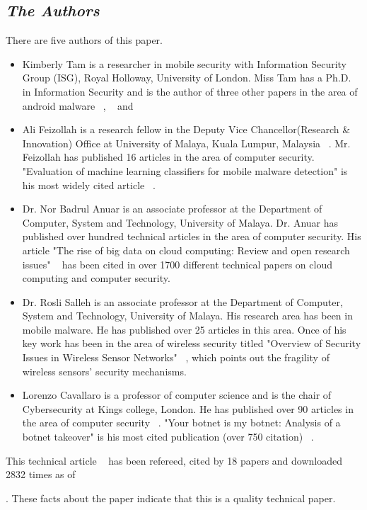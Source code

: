 \documentclass[letterpaper,10pt]{texMemo}
\begin{document}
\subsection*{\textit{The Authors}}
 There are five authors of this paper.
\begin {itemize}
    \item Kimberly Tam is a researcher in mobile security with Information Security Group (ISG), Royal Holloway, University of London. Miss Tam has a Ph.D. in Information Security and is the author of three other papers in the area of android malware ~\cite{aa0df639998f45b7ba185cb98b5566f6}, ~\cite{81e7d86ec07b4b2ebad265799695b710} and ~\cite{abda74ffb56a4eeabc5787b7903706cf}
    \item Ali Feizollah is a research fellow in the Deputy Vice Chancellor(Research \& Innovation) Office at University of Malaya, Kuala Lumpur, Malaysia ~\cite{UMEXPERT75:online}. Mr. Feizollah has published 16 articles in the area of computer security. "Evaluation of machine learning classifiers for mobile malware detection" is his most widely cited article ~\cite{Narudin2016}.
    \item Dr. Nor Badrul Anuar is an associate professor at the Department of Computer, System and Technology, University of Malaya. Dr. Anuar has published over hundred technical articles in the area of computer security. His article "The rise of big data on cloud computing: Review and open research issues" ~\cite{Theriseo64:online} has been cited in over 1700 different technical papers on cloud computing and computer security.
    \item Dr. Rosli Salleh is an associate professor at the Department of Computer, System and Technology, University of Malaya. His research area has been in mobile malware. He has published over 25 articles in this area. Once of his key work has been in the area of wireless security titled "Overview of Security Issues in Wireless Sensor Networks" ~\cite{6076376}, which points out the fragility of wireless sensors' security mechanisms.
    \item Lorenzo Cavallaro is a professor of computer science and is the chair of Cybersecurity at Kings college, London. He has published over 90 articles in the area of computer security ~\cite{LorenzoC9:online}. "Your botnet is my botnet: Analysis of a botnet takeover" is his most cited publication (over 750 citation) ~\cite{Stone-Gross:2009:YBM:1653662.1653738}.
\end{itemize}
This technical article ~\cite{Tam:2017:EAM:3022634.3017427} has been refereed, cited by 18 papers and downloaded 2832 times as of \date{\today}. These facts about the paper indicate that this is a quality technical paper.\\
\end{document}
